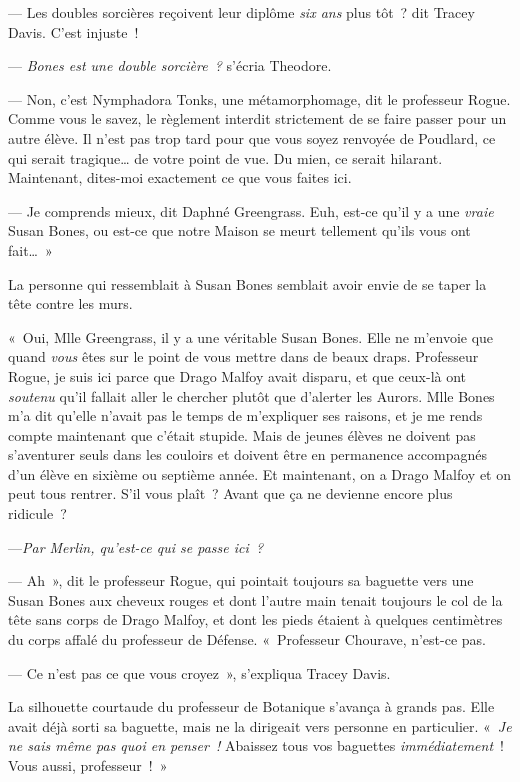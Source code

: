 --- Les doubles sorcières reçoivent leur diplôme \emph{six ans} plus tôt~? dit Tracey Davis.
C'est injuste~!

--- \emph{Bones est une double sorcière~?} s'écria Theodore.

--- Non, c'est Nymphadora Tonks, une métamorphomage, dit le professeur Rogue.
Comme vous le savez, le règlement interdit strictement de se faire passer pour un autre élève.
Il n'est pas trop tard pour que vous soyez renvoyée de Poudlard, ce qui serait tragique… de votre point de vue.
Du mien, ce serait hilarant.
Maintenant, dites-moi exactement ce que vous faites ici.

--- Je comprends mieux, dit Daphné Greengrass.
Euh, est-ce qu'il y a une \emph{vraie} Susan Bones, ou est-ce que notre Maison se meurt tellement qu'ils vous ont fait…~»

La personne qui ressemblait à Susan Bones semblait avoir envie de se taper la tête contre les murs.

«~Oui, Mlle Greengrass, il y a une véritable Susan Bones.
Elle ne m'envoie que quand \emph{vous} êtes sur le point de vous mettre dans de beaux draps.
Professeur Rogue, je suis ici parce que Drago Malfoy avait disparu, et que ceux-là ont \emph{soutenu} qu'il fallait aller le chercher plutôt que d'alerter les Aurors.
Mlle Bones m'a dit qu'elle n'avait pas le temps de m'expliquer ses raisons, et je me rends compte maintenant que c'était stupide.
Mais de jeunes élèves ne doivent pas s'aventurer seuls dans les couloirs et doivent être en permanence accompagnés d'un élève en sixième ou septième année.
Et maintenant, on a Drago Malfoy et on peut tous rentrer.
S'il vous plaît~?
Avant que ça ne devienne encore plus ridicule~?

---\emph{Par Merlin, qu'est-ce qui se passe ici~?}

--- Ah~», dit le professeur Rogue, qui pointait toujours sa baguette vers une Susan Bones aux cheveux rouges et dont l'autre main tenait toujours le col de la tête sans corps de Drago Malfoy, et dont les pieds étaient à quelques centimètres du corps affalé du professeur de Défense.
«~Professeur Chourave, n'est-ce pas.

--- Ce n'est pas ce que vous croyez~», s'expliqua Tracey Davis.

La silhouette courtaude du professeur de Botanique s'avança à grands pas.
Elle avait déjà sorti sa baguette, mais ne la dirigeait vers personne en particulier.
«~\emph{Je ne sais même pas quoi en penser~!} Abaissez tous vos baguettes \emph{immédiatement}~!
Vous aussi, professeur~!~»

